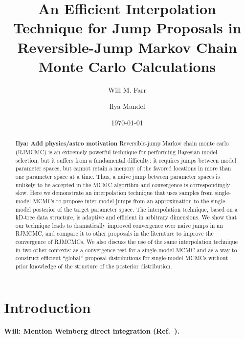 \documentclass[prd,preprint]{revtex4}
\newcommand{\ilya}[1]{{\color{red} \bf Ilya: #1}}
\newcommand{\will}[1]{{\color{blue} \bf Will: #1}}
\begin{document}
\title{An Efficient Interpolation Technique for Jump Proposals in
  Reversible-Jump Markov Chain Monte Carlo Calculations}

\date{\today}

\author{Will M. Farr}


\author{Ilya Mandel}


\begin{abstract}
  \ilya{Add physics/astro motivation} Reversible-jump Markov chain
  monte carlo (RJMCMC) is an extremely powerful technique for
  performing Bayesian model selection, but it suffers from a
  fundamental difficulty: it requires jumps between model parameter
  spaces, but cannot retain a memory of the favored locations in more
  than one parameter space at a time.  Thus, a naive jump between
  parameter spaces is unlikely to be accepted in the MCMC algorithm
  and convergence is correspondingly slow.  Here we demonstrate an
  interpolation technique that uses samples from single-model MCMCs to
  propose inter-model jumps from an approximation to the single-model
  posterior of the target parameter space.  The interpolation
  technique, based on a kD-tree data structure, is adaptive and
  efficient in arbitrary dimensions.  We show that our technique leads
  to dramatically improved convergence over naive jumps in an RJMCMC,
  and compare it to other proposals in the literature to improve the
  convergence of RJMCMCs.  We also discuss the use of the same
  interpolation technique in two other contexts: as a convergence test
  for a single-model MCMC and as a way to construct efficient
  ``global'' proposal distributions for single-model MCMCs without
  prior knowledge of the structure of the posterior distribution.
\end{abstract}

\maketitle

\section{Introduction}

\will{Mention Weinberg direct integration (Ref.~\cite{Weinberg2009}).}
\end{document}
